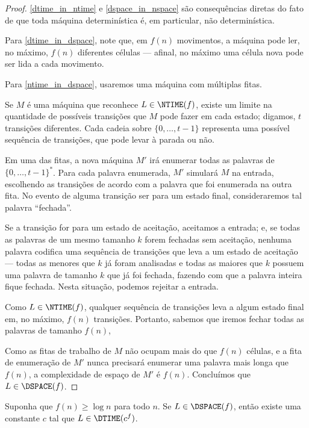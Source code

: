 \begin{proof}
    \ref{dtime_in_ntime} e \ref{dspace_in_nspace} são consequências diretas
    do fato de que toda máquina determinística é,
    em particular, não determinística.

    Para \ref{dtime_in_dspace},
    note que, em $f(n)$ movimentos,
    a máquina pode ler, no máximo,
    $f(n)$ diferentes células
    --- afinal, no máximo uma célula nova pode ser lida a cada movimento.

    Para \ref{ntime_in_dspace},
    usaremos uma máquina com múltiplas fitas.

    Se $M$ é uma máquina que reconhece $L \in \NTIME(f)$,
    existe um limite na quantidade de possíveis transições
    que $M$ pode fazer em cada estado;
    digamos, $t$ transições diferentes.
    Cada cadeia sobre $\{0, \dots, t-1\}$ representa uma possível
    sequência de transições,
    que pode levar à parada ou não.

    Em uma das fitas,
    a nova máquina $M'$
    irá enumerar todas as palavras de $\{0, \dots, t-1\}^*$.
    Para cada palavra enumerada,
    $M'$ simulará $M$ na entrada,
    escolhendo as transições de acordo com a palavra
    que foi enumerada na outra fita.
    No evento de alguma transição ser para um estado final,
    consideraremos tal palavra ``fechada''.

    Se a transição for para um estado de aceitação,
    aceitamos a entrada;
    e, se todas as palavras de um mesmo tamanho $k$
    forem fechadas sem aceitação,
    nenhuma palavra
    codifica uma sequência de transições
    que leva a um estado de aceitação
    --- todas as menores que $k$ já foram analisadas
    e todas as maiores que $k$
    possuem uma palavra de tamanho $k$ que já foi fechada,
    fazendo com que a palavra inteira fique fechada.
    Nesta situação, podemos rejeitar a entrada.

    Como $L \in \NTIME(f)$,
    qualquer sequência de transições leva a algum estado final
    em, no máximo, $f(n)$ transições.
    Portanto,
    sabemos que iremos fechar todas as palavras
    de tamanho $f(n)$,

    Como as fitas de trabalho de $M$
    não ocupam mais do que $f(n)$ células,
    e a fita de enumeração de $M'$
    nunca precisará enumerar uma palavra mais longa que $f(n)$,
    a complexidade de espaço de $M'$ é $f(n)$.
    Concluímos que $L \in \DSPACE(f)$.
\end{proof}

\begin{theorem}
    Suponha que $f(n) \geq \log n$ para todo $n$.
    Se $L \in \DSPACE(f)$,
    então existe uma constante $c$
    tal que $L \in \DTIME(c^f)$.
\end{theorem}

